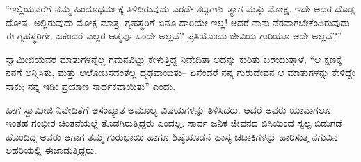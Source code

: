 “ಇಲ್ಲಿಯವರೆಗೆ ನಮ್ಮ ಹಿಂದೂಧರ್ಮಕ್ಕೆ ತಿಳಿದಿರುವುದು ಎರಡೇ ಶಬ್ದಗಳು–ತ್ಯಾಗ ಮತ್ತು ಮೋಕ್ಷ. ಇದೇ ಅದರ ದೊಡ್ಡ ದೋಷ. ಅಲ್ಲಿರುವುದು ಮೋಕ್ಷ ಮಾತ್ರ. ಗೃಹಸ್ಥರಿಗೆ ಏನೂ ದಾರಿಯೇ ಇಲ್ಲ! ಆದರೆ ನಾನು ನೆರವಾಗಬೇಕೆಂದಿರುವುದು ಈ ಗೃಹಸ್ಥರಿಗೇ. ಏಕೆಂದರೆ ಎಲ್ಲರ ಆತ್ಮವೂ ಒಂದೇ ಅಲ್ಲವೆ? ಪ್ರತಿಯೊಂದು ಜೀವಿಯ ಗುರಿಯೂ ಅದೇ ಅಲ್ಲವೆ?”

ಸ್ವಾಮೀಜಿಯವರ ಮಾತುಗಳನ್ನೆಲ್ಲ ಗಮನವಿಟ್ಟು ಕೇಳುತ್ತಿದ್ದ ನಿವೇದಿತಾ ಅದನ್ನು ಕುರಿತು ಬರೆಯುತ್ತಾಳೆ, “ಆ ಕ್ಷಣಕ್ಕೆ ನನಗೆ ಅನ್ನಿಸಿತು, ಮತ್ತು ಆಲೋಚಿಸದಂತೆಲ್ಲ ದೃಢವಾಯಿತು– ಏನೆಂದರೆ ನನ್ನ ಗುರುದೇವನ ಆ ಮಾತುಗಳನ್ನು ಕೇಳಿದ್ದೇ ಸಾಕು; ನನ್ನ ಇಡೀ ಪ್ರಯಾಣ ಸಾರ್ಥಕವಾಯಿತು” ಎಂದು.

ಹೀಗೆ ಸ್ವಾಮೀಜಿ ನಿವೇದಿತೆಗೆ ಅಸಂಖ್ಯಾತ ಅಮೂಲ್ಯ ವಿಷಯಗಳನ್ನು ತಿಳಿಸಿದರು. ಆದರೆ ಅವರು ಯಾವಾಗಲೂ ಇಂತಹ ಗಂಭೀರ ಚಿಂತನೆಯಲ್ಲೆ ತೊಡಗಿರುತ್ತಿದ್ದರು ಎಂದಲ್ಲ. ಸಾರ್ವ ಜನಿಕ ಜೀವನದ ಬಿಸಿಯಿಂದ ಸ್ವಲ್ಪ ಬಿಡುಗಡೆ ಹೊಂದಿದ್ದ ಅವರು ಆಗಾಗ ತಮ್ಮ ಗುರುಭಾಯಿ ಹಾಗೂ ಶಿಷ್ಯೆಯೊಡನೆ ಹಾಸ್ಯ ಚಟಾಕಿಗಳನ್ನು ಹಾರಿಸುತ್ತ ನಗುವಿನ ಲಹರಿಯಲ್ಲಿ ಈಜಾಡುತ್ತಿದ್ದರು.

